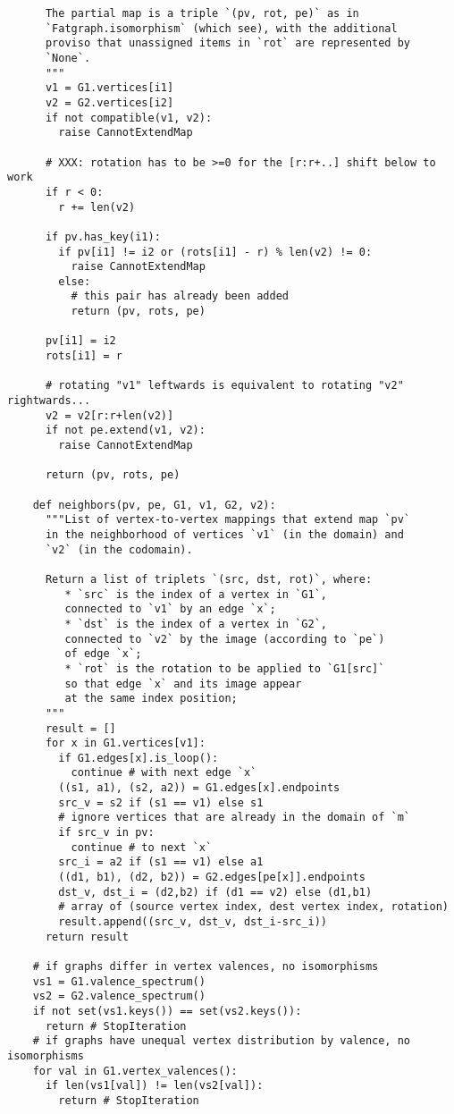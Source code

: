 \begin{lstlisting}
      The partial map is a triple `(pv, rot, pe)` as in
      `Fatgraph.isomorphism` (which see), with the additional
      proviso that unassigned items in `rot` are represented by
      `None`.
      """
      v1 = G1.vertices[i1]
      v2 = G2.vertices[i2]
      if not compatible(v1, v2):
        raise CannotExtendMap

      # XXX: rotation has to be >=0 for the [r:r+..] shift below to work
      if r < 0:
        r += len(v2)

      if pv.has_key(i1):
        if pv[i1] != i2 or (rots[i1] - r) % len(v2) != 0:
          raise CannotExtendMap
        else:
          # this pair has already been added
          return (pv, rots, pe)

      pv[i1] = i2
      rots[i1] = r

      # rotating "v1" leftwards is equivalent to rotating "v2" rightwards...
      v2 = v2[r:r+len(v2)]
      if not pe.extend(v1, v2):
        raise CannotExtendMap

      return (pv, rots, pe)

    def neighbors(pv, pe, G1, v1, G2, v2):
      """List of vertex-to-vertex mappings that extend map `pv`
      in the neighborhood of vertices `v1` (in the domain) and
      `v2` (in the codomain).

      Return a list of triplets `(src, dst, rot)`, where:
         * `src` is the index of a vertex in `G1`,
         connected to `v1` by an edge `x`;
         * `dst` is the index of a vertex in `G2`,
         connected to `v2` by the image (according to `pe`)
         of edge `x`;
         * `rot` is the rotation to be applied to `G1[src]`
         so that edge `x` and its image appear
         at the same index position;
      """
      result = []
      for x in G1.vertices[v1]:
        if G1.edges[x].is_loop():
          continue # with next edge `x`
        ((s1, a1), (s2, a2)) = G1.edges[x].endpoints
        src_v = s2 if (s1 == v1) else s1
        # ignore vertices that are already in the domain of `m`
        if src_v in pv:
          continue # to next `x`
        src_i = a2 if (s1 == v1) else a1
        ((d1, b1), (d2, b2)) = G2.edges[pe[x]].endpoints
        dst_v, dst_i = (d2,b2) if (d1 == v2) else (d1,b1)
        # array of (source vertex index, dest vertex index, rotation)
        result.append((src_v, dst_v, dst_i-src_i))
      return result
      
    # if graphs differ in vertex valences, no isomorphisms
    vs1 = G1.valence_spectrum()
    vs2 = G2.valence_spectrum()
    if not set(vs1.keys()) == set(vs2.keys()):
      return # StopIteration
    # if graphs have unequal vertex distribution by valence, no isomorphisms
    for val in G1.vertex_valences():
      if len(vs1[val]) != len(vs2[val]):
        return # StopIteration


\end{lstlisting}
